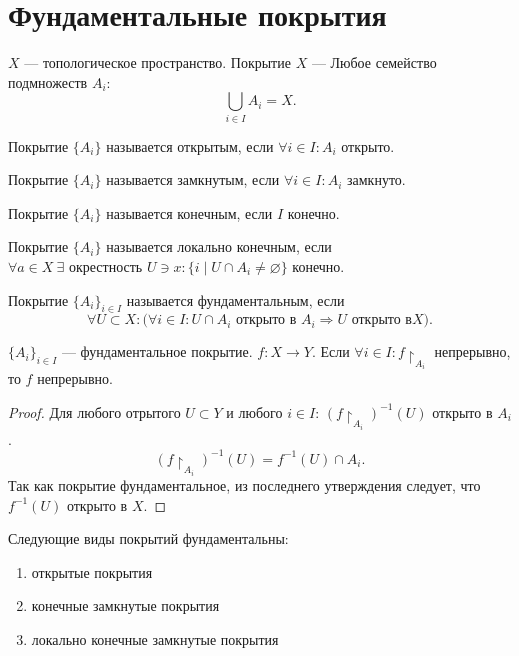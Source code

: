 \documentclass[11pt]{book}
\theoremstyle{definition}
\theoremstyle{plain}
\theoremstyle{plain}
\theoremstyle{definition}
\theoremstyle{remark}
\begin{document}
\section{Фундаментальные покрытия}
\begin{defn}
    $ X$ --- топологическое пространство. {\sf Покрытие}  $ X$ --- Любое семейство подмножеств  $ A_i$:
    \[
    \bigcup_{i \in  I} A_i = X
.\] 
\begin{description}
    \item Покрытие $ \{A_i\}$ называется {\sf открытым}, если $ \forall i \in I: A_i $ открыто. 
    \item Покрытие $ \{A_i\}$ называется {\sf замкнутым}, если $ \forall i \in I: A_i $ замкнуто. 
    \item Покрытие $ \{A_i\}$ называется {\sf конечным}, если $ I$ конечно. 
    \item Покрытие $ \{A_i\}$ называется {\sf локально конечным}, если $ \forall a \in X ~ \exists \text{ окрестность } U \ni x: \{i \mid U \cap A_i \ne \varnothing\}$ конечно. 
\end{description}
\end{defn}
\begin{defn}
    Покрытие  $ \{A_i\}_{i \in I}$ называется {\sf фундаментальным}, если \[
	\forall  U \subset X : \bigl( \forall i \in I: U \cap A_i \text{ открыто в } A_i \Longrightarrow U \text{ открыто в} X\bigr)
    .\]  
\end{defn}
\begin{thm}
    $ \{A_i\}_{i \in I}$ --- фундаментальное покрытие. $ f: X \to  Y$. Если $ \forall i \in I: f\!\!\upharpoonright_{A_i}$ непрерывно, то $ f$ непрерывно.
\end{thm}
\begin{proof}
    Для любого отрытого $ U \subset Y$ и любого $ i \in I$: $ \left( f\!\!\upharpoonright_{A_i} \right)^{-1}(U)$ открыто в $ A_i$.
     \[
	 \left( f\!\!\upharpoonright_{A_i} \right)^{-1}(U) = f^{-1}(U) \cap A_i
    .\] 
    Так как покрытие фундаментальное, из последнего утверждения следует, что $ f^{-1}(U)$ открыто в $ X$.
\end{proof}
\begin{thm}
    Следующие виды покрытий фундаментальны:
    \begin{enumerate}[noitemsep]
        \item открытые покрытия
	\item конечные замкнутые покрытия
	\item локально конечные замкнутые покрытия
    \end{enumerate}
\end{thm}
\end{document}
